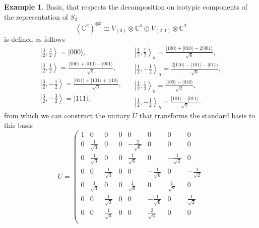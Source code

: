 \documentclass[11pt,letterpaper]{article}
\theoremstyle{plain}
\theoremstyle{plain}
\theoremstyle{plain}
\theoremstyle{plain}
\theoremstyle{plain}
\theoremstyle{plain}
\theoremstyle{plain}
\theoremstyle{definition}
\newtheorem{smexample}[smtheorem]{Example}
\theoremstyle{plain}
\begin{document}
\begin{smexample}\label{ex:Sn_block_diagonalization}
Basis, that respects the decomposition on isotypic components of the representation of $S_3$ 
\[
    \left(\mathbb{C}^2\right)^{\otimes 3} \cong V_{(3)} \otimes \mathbb{C}^4 \oplus V_{{(2,1)}} \otimes \mathbb{C}^2
\]
is defined as follows
\[
    \begin{gathered}
    \left|\frac{3}{2}, \frac{3}{2}\right\rangle=|000\rangle, \\
    \left|\frac{3}{2}, \frac{1}{2}\right\rangle=\frac{|100\rangle+|010\rangle+|001\rangle}{\sqrt{3}}, \\
    \left|\frac{3}{2}, -\frac{1}{2}\right\rangle=\frac{|011\rangle+|101\rangle+|110\rangle}{\sqrt{3}}, \\
    \left|\frac{3}{2}, -\frac{3}{2}\right\rangle=|111\rangle, \\
    \end{gathered}\quad
    \begin{gathered}
    \left|\frac{1}{2}, \frac{1}{2}\right\rangle_a=\frac{|100\rangle+|010\rangle-2|001\rangle}{\sqrt{6}}, \\
    \left|\frac{1}{2}, -\frac{1}{2}\right\rangle_a=\frac{2|110\rangle-|101\rangle-|011\rangle}{\sqrt{6}}, \\
    \left|\frac{1}{2}, \frac{1}{2}\right\rangle_b=\frac{|100\rangle-|010\rangle}{\sqrt{2}}, \\
    \left|\frac{1}{2}, -\frac{1}{2}\right\rangle_b=\frac{|101\rangle-|011\rangle}{\sqrt{2}} .
    \end{gathered}
\]
from which we can construct the unitary $U$ that transforms the standard basis to this basis
\begin{equation}\label{eq:basis_transform_example}
    U=\left(\begin{array}{cccccccc}
    1 & 0 & 0 & 0 & 0 & 0 & 0 & 0 \\
    0 & \frac{1}{\sqrt{3}} & 0 & 0 & -\frac{2}{\sqrt{6}} & 0 & 0 & 0 \\
    0 & \frac{1}{\sqrt{3}} & 0 & 0 & \frac{1}{\sqrt{6}} & 0 & -\frac{1}{\sqrt{2}} & 0 \\
    0 & 0 & \frac{1}{\sqrt{3}} & 0 & 0 & -\frac{1}{\sqrt{6}} & 0 & -\frac{1}{\sqrt{2}} \\
    0 & \frac{1}{\sqrt{3}} & 0 & 0 & \frac{1}{\sqrt{6}} & 0 & \frac{1}{\sqrt{2}} & 0 \\
    0 & 0 & \frac{1}{\sqrt{3}} & 0 & 0 & -\frac{1}{\sqrt{6}} & 0 & \frac{1}{\sqrt{2}} \\
    0 & 0 & \frac{1}{\sqrt{3}} & 0 & 0 & \frac{2}{\sqrt{6}} & 0 & 0 \\

\end{array}
\end{equation}
\end{smexample}
\end{document}
